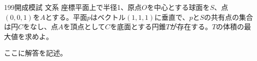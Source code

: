 \begin{prob}{199}{}{開成模試 文系}
 座標平面上で半径1、原点$O$を中心とする球面を$S$、点$(0,0,1)$を$A$とする。平面$p$はベクトル$(1,1,1)$に垂直で、$p$と$S$の共有点の集合は円$C$をなし、点$A$を頂点として$C$を底面とする円錐$T$が存在する。$T$の体積の最大値を求めよ。
\end{prob}
ここに解答を記述。